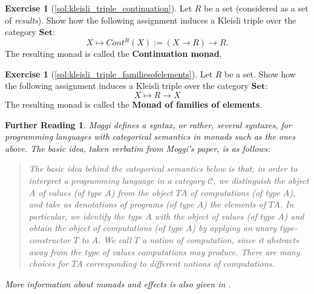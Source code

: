 \documentclass[a4paper,11pt, oneside,titlepage=false]{scrbook}
\theoremstyle{plain}
\newtheorem*{reading*}{Further Reading}
\theoremstyle{definition}
\newtheorem{exer}[thm]{Exercise}
\newcommand{\Cat}[1]{\mathcal{#1}}
\newcommand{\CC}{\Cat{C}}
\newcommand{\Catb}[1]{\mathbf{#1}}
\newcommand{\SET}{\Catb{Set}}
\begin{document}
\begin{exer}[\cref{sol:kleisli_triple_continuation}]\label{exer:kleisli_triple_continuation} Let $R$ be a set (considered as a set of \textit{results}). Show how the following assignment induces a Kleisli triple over the category $\SET$:
\[
X\mapsto Cont^R(X) := (X \to R) \to R.
\]
The resulting monad is called the \textbf{Continuation monad}.
\end{exer}


\begin{exer}[\cref{sol:kleisli_triple_familiesofelements}]\label{exer:kleisli_triple_familiesofelements} Let $R$ be a set. Show how the following assignment induces a Kleisli triple over the category $\SET$:
\[
X \mapsto R \to X
\]
The resulting monad is called the \textbf{Monad of families of elements}.

\end{exer}


\begin{reading*}
  Moggi \cite{DBLP:journals/iandc/Moggi91} defines a syntax, or rather, several syntaxes, for programming languages with categorical semantics in monads such as the ones above.
  The basic idea, taken verbatim from Moggi's paper, is as follows:
  \begin{quote}
    The basic idea behind the categorical semantics below is that, in order to interpret a programming language in a category $\CC$, we distinguish the object $A$ of values (of type $A$) from the object $T A$ of computations (of type $A$), and take as denotations of programs (of type $A$) the \emph{elements} of $T A$.
In particular, we identify the type $A$ with the object of values (of type $A$) and obtain the object
of computations (of type $A$) by applying an unary type-constructor $T$ to $A$. We call $T$ a \emph{notion of computation}, since it abstracts away from the type of values computations may produce. There are many choices for $T A$ corresponding to different notions of computations.
  \end{quote}

  More information about monads and effects is also given in \cite{DBLP:conf/ac/BentonHM00}.
\end{reading*}
\end{document}
